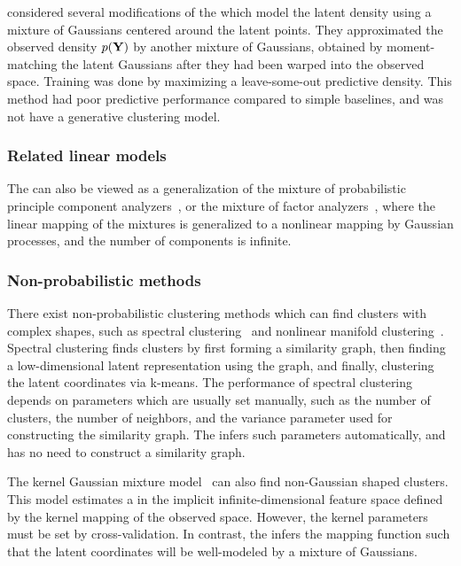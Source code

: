 \citet{nickisch2010gaussian} considered several modifications of the \gplvm{} which model the latent density using a mixture of Gaussians centered around the latent points.
They approximated the observed density $p(\mathbf{Y})$ by another mixture of Gaussians, obtained by moment-matching the latent Gaussians after they had been warped into the observed space.
Training was done by maximizing a leave-some-out predictive density.
This method had poor predictive performance compared to simple baselines, and was not have a generative clustering model.


\subsubsection{Related linear models}
The \iwmm{} can also be viewed as a generalization of the mixture of probabilistic principle component analyzers~\citep{tipping1999mixtures}, or the mixture of factor analyzers~\citep{ghahramani2000variational}, where the linear mapping of the mixtures is generalized to a nonlinear mapping by Gaussian processes, and the number of components is infinite.


\subsubsection{Non-probabilistic methods}
There exist non-probabilistic clustering methods which can find clusters with complex shapes, such as spectral clustering~\citep{ng2002spectral} and nonlinear manifold clustering~\citep{cao2006nonlinear,elhamifar2011sparse}.
Spectral clustering finds clusters by first forming a similarity graph, then finding a low-dimensional latent representation using the graph, and finally, clustering the latent coordinates via k-means.
The performance of spectral clustering depends on parameters which are usually set manually, such as the number of clusters, the number of neighbors, and the variance parameter used for constructing the similarity graph.
The \iwmm{} infers such parameters automatically, and has no need to construct a similarity graph.

The kernel Gaussian mixture model~\citep{wang2003kernel} can also find non-Gaussian shaped clusters.
This model estimates a \GMM{} in the implicit infinite-dimensional feature space defined by the kernel mapping of the observed space.
However, the kernel parameters must be set by cross-validation.
In contrast, the \iwmm{} infers the mapping function such that the latent coordinates will be well-modeled by a mixture of Gaussians.

